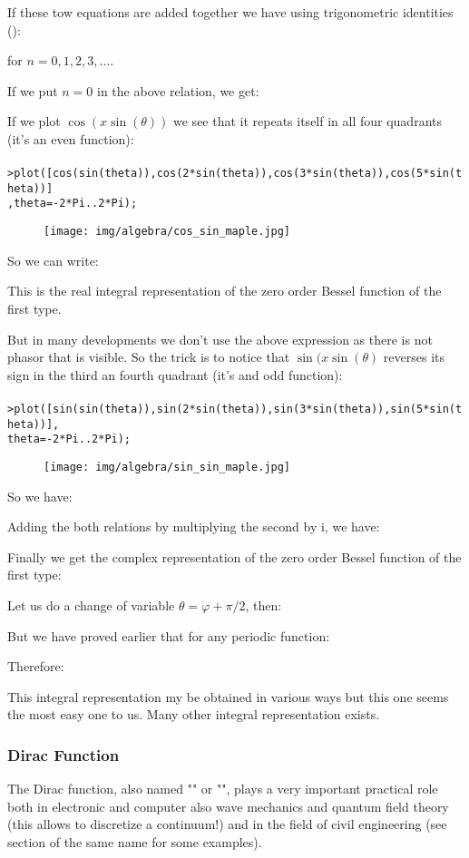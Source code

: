 	If these tow equations are added together we have using trigonometric identities ():
	
	for $n=0,1,2,3,\ldots$.
	
	If we put $n=0$ in the above relation, we get:
	
	If we plot $\cos(x\sin(\theta))$ we see that it repeats itself in all four quadrants (it's an even function):\\\\
	\texttt{>plot([cos(sin(theta)),cos(2*sin(theta)),cos(3*sin(theta)),cos(5*sin(theta))]\\
	,theta=-2*Pi..2*Pi);}
	\begin{figure}[H]
		\centering
		\texttt{[image: img/algebra/cos\_sin\_maple.jpg]}
	\end{figure}
	So we can write:
	
	This is the real integral representation of the zero order Bessel function of the first type.
	
	But in many developments we don't use the above expression as there is not phasor that is visible. So the trick is to notice that $\sin(x\sin(\theta)$ reverses its sign in the third an fourth quadrant (it's and odd function):\\\\
		\texttt{>plot([sin(sin(theta)),sin(2*sin(theta)),sin(3*sin(theta)),sin(5*sin(theta))],\\
	theta=-2*Pi..2*Pi);}
	\begin{figure}[H]
		\centering
		\texttt{[image: img/algebra/sin\_sin\_maple.jpg]}
	\end{figure}
	So we have:
	
	Adding the both relations by multiplying the second by $\mathrm{i}$,  we have:
	
	Finally we get the complex representation of the zero order Bessel function of the first type:
	
	
	Let us do a change of variable $\theta=\varphi+\pi/2$, then:
	
	But we have proved earlier that for any periodic function:
	
	Therefore:
	
	This integral representation my be obtained in various ways but this one seems the most easy one to us. Many other integral representation exists.

	\subsubsection{Dirac Function}
	The Dirac function, also named "" or "", plays a very important practical role both in electronic and computer also  wave mechanics and quantum field theory (this allows to discretize a continuum!) and in the field of civil engineering (see section  of the same name for some examples).
	
